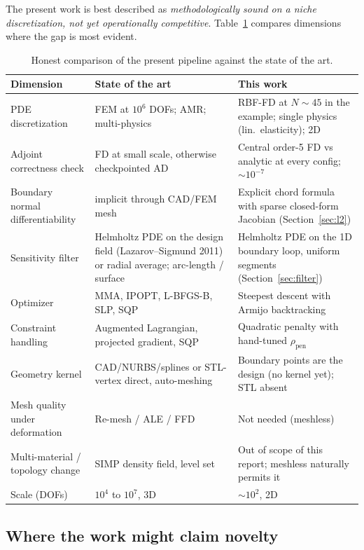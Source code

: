 \documentclass[11pt,a4paper]{article}
\begin{document}
The present work is best described as \emph{methodologically
sound on a niche discretization, not yet operationally
competitive}. Table~\ref{tab:sota} compares dimensions where the
gap is most evident.

\begin{table}[h]
\centering
\caption{Honest comparison of the present pipeline against the
state of the art.}
\label{tab:sota}
\renewcommand{\arraystretch}{1.3}
\begin{tabular}{p{}p{}p{}}
\toprule
Dimension & State of the art & This work \\
\midrule
PDE discretization & FEM at $10^6$ DOFs; AMR; multi-physics
  & RBF-FD at $N \sim 45$ in the example; single physics
    (lin.\ elasticity); 2D \\
Adjoint correctness check & FD at small scale, otherwise
checkpointed AD
  & Central order-5 FD vs analytic at every config; $\sim 10^{-7}$ \\
Boundary normal differentiability & implicit through CAD/FEM mesh
  & Explicit chord formula with sparse closed-form Jacobian
    (Section~\ref{sec:l2}) \\
Sensitivity filter & Helmholtz PDE on the design field
(Lazarov--Sigmund 2011) or radial average; arc-length / surface
  & Helmholtz PDE on the 1D boundary loop, uniform segments
    (Section~\ref{sec:filter}) \\
Optimizer & MMA, IPOPT, L-BFGS-B, SLP, SQP
  & Steepest descent with Armijo backtracking \\
Constraint handling & Augmented Lagrangian, projected gradient,
SQP
  & Quadratic penalty with hand-tuned $\rho_{\text{pen}}$ \\
Geometry kernel & CAD/NURBS/splines or STL-vertex direct,
auto-meshing
  & Boundary points are the design (no kernel yet); STL absent \\
Mesh quality under deformation & Re-mesh / ALE / FFD
  & Not needed (meshless) \\
Multi-material / topology change & SIMP density field, level set
  & Out of scope of this report; meshless naturally permits it \\
Scale (DOFs) & $10^4$ to $10^7$, 3D
  & $\sim 10^2$, 2D \\
\bottomrule
\end{tabular}
\end{table}

\subsection{Where the work might claim novelty}
\end{document}
